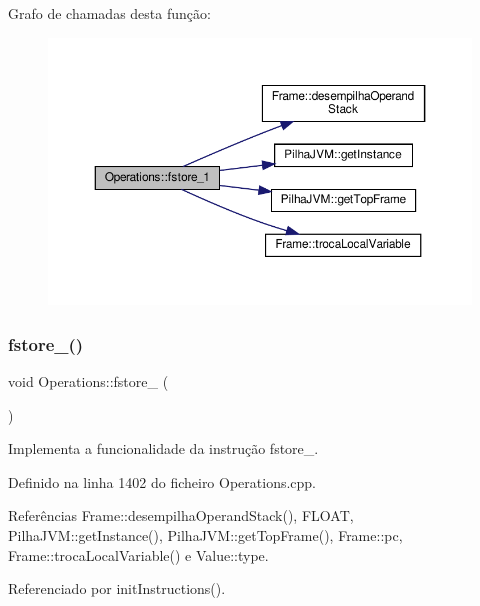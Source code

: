 Grafo de chamadas desta função\+:
\nopagebreak
\begin{figure}[H]
\begin{center}
\leavevmode
\includegraphics[width=350pt]{classOperations_a2ea876acd29db9eec798302229bfd5e5_cgraph}
\end{center}
\end{figure}
\mbox{\label{classOperations_a6d0a2faa9f164d49accf491a95364e2f}} 
\subsubsection{\texorpdfstring{fstore\+\_()}{fstore\_2()}}
{\footnotesize\ttfamily void Operations\+::fstore\+\_ (\begin{DoxyParamCaption}{ }\end{DoxyParamCaption})\hspace{0.3cm}{\ttfamily [private]}}



Implementa a funcionalidade da instrução fstore\+\_. 



Definido na linha 1402 do ficheiro Operations.\+cpp.



Referências Frame\+::desempilha\+Operand\+Stack(), F\+L\+O\+AT, Pilha\+J\+V\+M\+::get\+Instance(), Pilha\+J\+V\+M\+::get\+Top\+Frame(), Frame\+::pc, Frame\+::troca\+Local\+Variable() e Value\+::type.



Referenciado por init\+Instructions().

